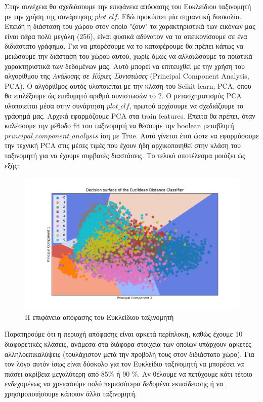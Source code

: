 \documentclass[11pt]{article} %
\begin{document}
Στην συνέχεια θα σχεδιάσουμε την επιφάνεια απόφασης του Ευκλείδιου ταξινομητή με την χρήση της συνάρτησης $plot\_clf$. Εδώ προκύπτει μία σημαντική δυσκολία. Επειδή η διάσταση του χώρου στον οποίο "ζουν" τα χαρακτηριστικά των εικόνων μας είναι πάρα πολύ μεγάλη (256), είναι φυσικά αδύνατον να τα απεικονίσουμε σε ένα διδιάστατο γράφημα. Για να μπορέσουμε να το καταφέρουμε θα πρέπει κάπως να μειώσουμε την διάσταση του χώρου αυτού, χωρίς όμως να αλλοιώσουμε τα ποιοτικά χαρακτηριστικά των δεδομένων μας. Αυτό μπορεί να επιτευχθεί με την χρήση του αλγορίθμου της \textit{Ανάλυσης σε Κύριες Συνιστώσες} (Principal Component Analysis, PCA). Ο αλγόριθμος αυτός υλοποιείται με την κλάση του Scikit-learn, PCA, όπου θα επιλέξουμε ώς επιθυμητό αριθμό συνιστωσών το 2. Ο μετασχηματισμός PCA υλοποιείται μέσα στην συνάρτηση $plot\_clf$, πρωτού αρχίσουμε να σχεδιάζουμε το γράφημά μας. Αρχικά εφαρμόζουμε PCA στα train features. Έπειτα θα πρέπει, όταν καλέσουμε την μέθοδο fit του ταξινομητή να θέσουμε την boolean μεταβλητή $principal\_component\_analysis$ ίση με True. Αυτό γίνεται έτσι ώστε να εφαρμόσουμε την τεχνική PCA στις μέσες τιμές που έχουν ήδη αρχικοποιηθεί στην κλάση του ταξινομητή για να έχουμε συμβατές διαστάσεις. Το τελικό αποτέλεσμα μοιάζει ώς εξής:\\

\begin{figure}[H]
    \centering
    \includegraphics[width=1\textwidth]{plots/dec_surf.png}
    \caption{Η επιφάνεια απόφασης του Ευκλείδιου ταξινομητή}
    \label{fig:surface}
\end{figure}

Παρατηρούμε ότι η περιοχή απόφασης είναι αρκετά περίπλοκη, καθώς έχουμε 10 διαφορετικές κλάσεις, ανάμεσα στα διάφορα στοιχεία των οποίων υπάρχουν αρκετές αλληλοεπικαλύψεις (τουλάχιστον μετά την προβολή τους στον διδιάστατο χώρο). Για τον λόγο αυτόν ίσως είναι δύσκολο για τον Ευκλείδιο ταξινομητή να μπορέσει να πιάσει ακρίβεια μεγαλύτερη από 85\% ή 90 \%. Αν θέλουμε να πετύχουμε κάτι τέτοιο ενδεχομένως να χρειασούμε πολύ περισσότερα δεδομένα  εκπαίδευσης ή να χρησιμοποιήσουμε κάποιον άλλο ταξινομητή.\\
\end{document}
